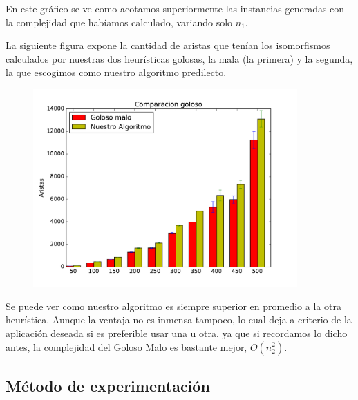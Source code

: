 En este gráfico se ve como acotamos superiormente las instancias generadas con la complejidad que habíamos calculado, variando solo $n_1$.

La siguiente figura expone la cantidad de aristas que tenían los isomorfismos calculados por nuestras dos heurísticas golosas, la mala (la primera) y la segunda, la que escogimos como nuestro algoritmo predilecto.

\begin{figure}[H]
 \centering
	\includegraphics[width=0.9\textwidth]{graficos/problema_4/calidad.pdf}
	\caption{}
	\label{fig:problema4-4}
\end{figure}

Se puede ver como nuestro algoritmo es siempre superior en promedio a la otra heurística. Aunque la ventaja no es  inmensa tampoco, lo cual deja a criterio de la aplicación deseada si es preferible usar una u otra, ya que si recordamos lo dicho antes, la complejidad del Goloso Malo es bastante mejor, $O(n_2^2)$.

\subsection{Método de experimentación}
